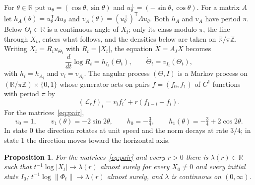 \documentclass[11pt]{amsart}
\newtheorem{proposition}[theorem]{Proposition}
\newcommand{\R}{\mathbb{R}}
\newcommand{\cL}{\mathcal{L}}
\begin{document}
For $\theta\in\R$ put $u_\theta=(\cos\theta,\sin\theta)$ and $u_\theta^\perp=(-\sin\theta,\cos\theta)$.
For a matrix $A$ let $h_A(\theta)=u_\theta^{\mathsf T}Au_\theta$ and $v_A(\theta)=(u_\theta^\perp)^{\mathsf T}Au_\theta$.
Both $h_A$ and $v_A$ have period $\pi$. Below $\Theta_t\in\R$ is a continuous angle of $X_t$; only its class modulo
$\pi$, the line through $X_t$, enters what follows, and the densities below are taken on $\R/\pi\mathbb{Z}$.
Writing $X_t=R_tu_{\Theta_t}$ with $R_t=|X_t|$, the equation $\dot X=A_IX$ becomes
\begin{equation}\label{eq:polar}
\frac{d}{dt}\log R_t=h_{I_t}(\Theta_t),\qquad \dot\Theta_t=v_{I_t}(\Theta_t),
\end{equation}
with $h_i=h_{A_i}$ and $v_i=v_{A_i}$. The angular process $(\Theta,I)$ is a Markov process on $(\R/\pi\mathbb Z)\times\{0,1\}$
whose generator acts on pairs $f=(f_0,f_1)$ of $C^1$ functions with period $\pi$ by
\begin{equation}\label{eq:anggen}
(\cL_rf)_i=v_if_i'+r(f_{1-i}-f_i).
\end{equation}
For the matrices~\eqref{eq:pair},
\begin{equation}\label{eq:hv}
v_0=1,\qquad v_1(\theta)=-2\sin2\theta,\qquad h_0=-\tfrac34,\qquad h_1(\theta)=-\tfrac34+2\cos2\theta .
\end{equation}
In state $0$ the direction rotates at unit speed and the norm decays at rate $3/4$; in state $1$ the direction moves
toward the horizontal axis.

\begin{proposition}\label{prop:exp}
For the matrices~\eqref{eq:pair} and every $r>0$ there is $\lambda(r)\in\R$ such that $t^{-1}\log|X_t|\to\lambda(r)$
almost surely for every $X_0\ne0$ and every initial state $I_0$; $t^{-1}\log\|\Phi_t\|\to\lambda(r)$ almost surely,
and $\lambda$ is continuous on $(0,\infty)$.
\end{proposition}
\end{document}
